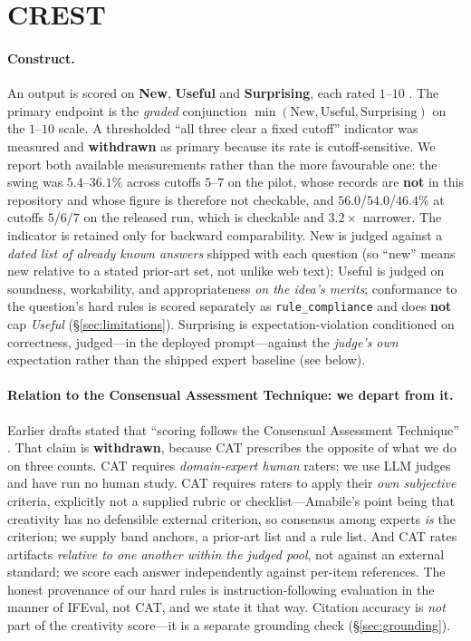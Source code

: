 \section{CREST}
\label{sec:crest}

\paragraph{Construct.} An output is scored on \textbf{New}, \textbf{Useful} and
\textbf{Surprising}, each rated $1$--$10$ \citep{runco2012standard,boden2004creative}. The primary
endpoint is the \emph{graded} conjunction $\min(\text{New},\text{Useful},\text{Surprising})$ on the
$1$--$10$ scale. A thresholded ``all three clear a fixed cutoff'' indicator was measured and
\textbf{withdrawn} as primary because its rate is cutoff-sensitive. We report both available
measurements rather than the more favourable one: the swing was $5.4$--$36.1\%$ across cutoffs
$5$--$7$ on the pilot, whose records are \textbf{not} in this repository and whose figure is therefore
not checkable, and $56.0$/$54.0$/$46.4\%$ at cutoffs $5$/$6$/$7$ on the released run, which is
checkable and $3.2{\times}$ narrower. The indicator is retained only for backward comparability. New is
judged against a \emph{dated list of already known answers} shipped with each question (so ``new''
means new relative to a stated prior-art set, not unlike web text); Useful is judged on soundness,
workability, and appropriateness \emph{on the idea's merits}; conformance to the question's hard
rules is scored separately as \texttt{rule\_compliance} and does \textbf{not} cap \emph{Useful}
(\S\ref{sec:limitations}). Surprising is expectation-violation conditioned on correctness,
judged---in the deployed prompt---against the \emph{judge's own} expectation rather than the shipped
expert baseline (see below).

\paragraph{Relation to the Consensual Assessment Technique: we depart from it.} Earlier drafts
stated that ``scoring follows the Consensual Assessment Technique'' \citep{amabile1982cat,
amabile1996context}. That claim is \textbf{withdrawn}, because CAT prescribes the opposite of what
we do on three counts. CAT requires \emph{domain-expert human} raters; we use LLM judges and have
run no human study. CAT requires raters to apply their \emph{own subjective} criteria, explicitly
not a supplied rubric or checklist---Amabile's point being that creativity has no defensible
external criterion, so consensus among experts \emph{is} the criterion; we supply band anchors, a
prior-art list and a rule list. And CAT rates artifacts \emph{relative to one another within the
judged pool}, not against an external standard; we score each answer independently against
per-item references. The honest provenance of our hard rules is instruction-following evaluation in
the manner of IFEval, not CAT, and we state it that way. Citation accuracy is \emph{not} part of the
creativity score---it is a separate grounding check (\S\ref{sec:grounding}).

